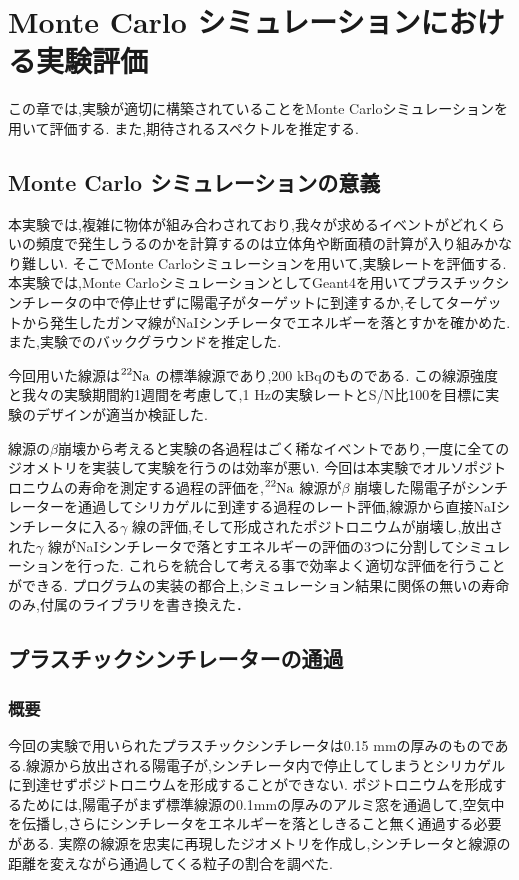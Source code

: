 \chapter{Monte Carlo シミュレーションにおける実験評価}\label{simulation}

この章では,実験が適切に構築されていることをMonte Carloシミュレーションを用いて評価する.
また,期待されるスペクトルを推定する.

\section{Monte Carlo シミュレーションの意義}

本実験では,複雑に物体が組み合わされており,我々が求めるイベントがどれくらいの頻度で発生しうるのかを計算するのは立体角や断面積の計算が入り組みかなり難しい.
そこでMonte Carloシミュレーションを用いて,実験レートを評価する.本実験では,Monte CarloシミュレーションとしてGeant4\cite{geant4}を用いてプラスチックシンチレータの中で停止せずに陽電子がターゲットに到達するか,そしてターゲットから発生したガンマ線がNaIシンチレータでエネルギーを落とすかを確かめた.
また,実験でのバックグラウンドを推定した.

今回用いた線源は$\ce{^{22}Na}$ の標準線源であり,200 kBqのものである.
この線源強度と我々の実験期間約1週間を考慮して,1 Hzの実験レートとS/N比100を目標に実験のデザインが適当か検証した.

線源の$\beta$崩壊から考えると実験の各過程はごく稀なイベントであり,一度に全てのジオメトリを実装して実験を行うのは効率が悪い.
今回は本実験でオルソポジトロニウムの寿命を測定する過程の評価を,$\ce{^{22}Na}$ 線源が$\beta$ 崩壊した陽電子がシンチレーターを通過してシリカゲルに到達する過程のレート評価,線源から直接NaIシンチレータに入る$\gamma$ 線の評価,そして形成されたポジトロニウムが崩壊し,放出された$\gamma$ 線がNaIシンチレータで落とすエネルギーの評価の3つに分割してシミュレーションを行った.
これらを統合して考える事で効率よく適切な評価を行うことができる.
プログラムの実装の都合上,シミュレーション結果に関係の無いの寿命のみ,付属のライブラリを書き換えた．

\section{プラスチックシンチレーターの通過}
\label{section_test1}

\subsection{概要}
今回の実験で用いられたプラスチックシンチレータは0.15 mmの厚みのものである.線源から放出される陽電子が,シンチレータ内で停止してしまうとシリカゲルに到達せずポジトロニウムを形成することができない.
ポジトロニウムを形成するためには,陽電子がまず標準線源の0.1mmの厚みのアルミ窓を通過して,空気中を伝播し,さらにシンチレータをエネルギーを落としきること無く通過する必要がある.
実際の線源を忠実に再現したジオメトリを作成し,シンチレータと線源の距離を変えながら通過してくる粒子の割合を調べた.

